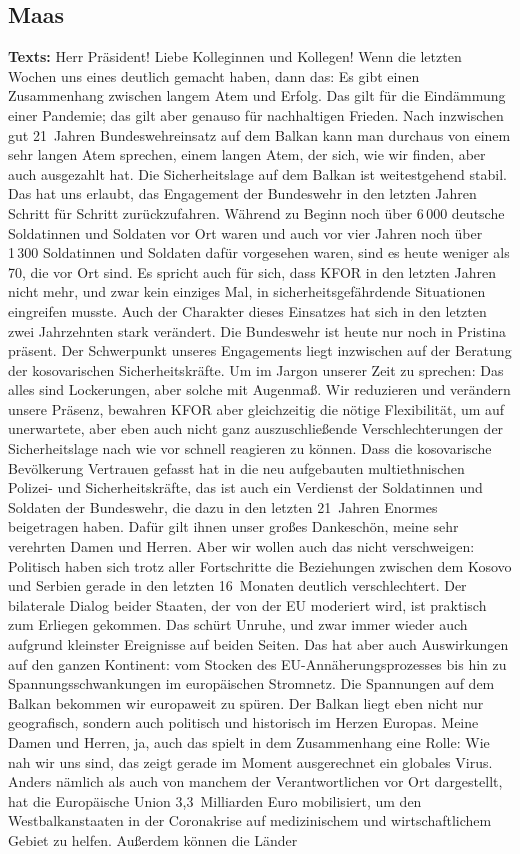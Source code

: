 \documentclass{article}
\begin{document}
\subsection{Maas}
\noindent\textbf{Texts:} Herr Präsident! Liebe Kolleginnen und Kollegen! Wenn die letzten Wochen uns eines deutlich gemacht haben, dann das: Es gibt einen Zusammenhang zwischen langem Atem und Erfolg. Das gilt für die Eindämmung einer Pandemie; das gilt aber genauso für nachhaltigen Frieden. Nach inzwischen gut 21 Jahren Bundeswehreinsatz auf dem Balkan kann man durchaus von einem sehr langen Atem sprechen, einem langen Atem, der sich, wie wir finden, aber auch ausgezahlt hat. Die Sicherheitslage auf dem Balkan ist weitestgehend stabil. Das hat uns erlaubt, das Engagement der Bundeswehr in den letzten Jahren Schritt für Schritt zurückzufahren. Während zu Beginn noch über 6 000 deutsche Soldatinnen und Soldaten vor Ort waren und auch vor vier Jahren noch über 1 300 Soldatinnen und Soldaten dafür vorgesehen waren, sind es heute weniger als 70, die vor Ort sind. Es spricht auch für sich, dass KFOR in den letzten Jahren nicht mehr, und zwar kein einziges Mal, in sicherheitsgefährdende Situationen eingreifen musste. Auch der Charakter dieses Einsatzes hat sich in den letzten zwei Jahrzehnten stark verändert. Die Bundeswehr ist heute nur noch in Pristina präsent. Der Schwerpunkt unseres Engagements liegt inzwischen auf der Beratung der kosovarischen Sicherheitskräfte. Um im Jargon unserer Zeit zu sprechen: Das alles sind Lockerungen, aber solche mit Augenmaß. Wir reduzieren und verändern unsere Präsenz, bewahren KFOR aber gleichzeitig die nötige Flexibilität, um auf unerwartete, aber eben auch nicht ganz auszuschließende Verschlechterungen der Sicherheitslage nach wie vor schnell reagieren zu können. Dass die kosovarische Bevölkerung Vertrauen gefasst hat in die neu aufgebauten multiethnischen Polizei- und Sicherheitskräfte, das ist auch ein Verdienst der Soldatinnen und Soldaten der Bundeswehr, die dazu in den letzten 21 Jahren Enormes beigetragen haben. Dafür gilt ihnen unser großes Dankeschön, meine sehr verehrten Damen und Herren.  Aber wir wollen auch das nicht verschweigen: Politisch haben sich trotz aller Fortschritte die Beziehungen zwischen dem Kosovo und Serbien gerade in den letzten 16 Monaten deutlich verschlechtert. Der bilaterale Dialog beider Staaten, der von der EU moderiert wird, ist praktisch zum Erliegen gekommen. Das schürt Unruhe, und zwar immer wieder auch aufgrund kleinster Ereignisse auf beiden Seiten. Das hat aber auch Auswirkungen auf den ganzen Kontinent: vom Stocken des EU-Annäherungsprozesses bis hin zu Spannungsschwankungen im europäischen Stromnetz. Die Spannungen auf dem Balkan bekommen wir europaweit zu spüren. Der Balkan liegt eben nicht nur geografisch, sondern auch politisch und historisch im Herzen Europas. Meine Damen und Herren, ja, auch das spielt in dem Zusammenhang eine Rolle: Wie nah wir uns sind, das zeigt gerade im Moment ausgerechnet ein globales Virus. Anders nämlich als auch von manchem der Verantwortlichen vor Ort dargestellt, hat die Europäische Union 3,3 Milliarden Euro mobilisiert, um den Westbalkanstaaten in der Coronakrise auf medizinischem und wirtschaftlichem Gebiet zu helfen. Außerdem können die Länder 
\end{document}
